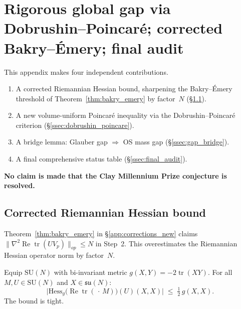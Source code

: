 \section{Rigorous global gap via Dobrushin--Poincar\'{e}; corrected Bakry--\'{E}mery; final audit}
\label{app:global_gap_audit}

This appendix makes four independent contributions.
\begin{enumerate}
\item A corrected Riemannian Hessian bound, sharpening the Bakry--\'{E}mery threshold of Theorem~\ref{thm:bakry_emery} by factor~$N$ (\S\ref{ssec:hess_correction}).
\item A new volume-uniform Poincar\'{e} inequality via the Dobrushin--Poincar\'{e} criterion (\S\ref{ssec:dobrushin_poincare}).
\item A bridge lemma: Glauber gap $\Rightarrow$ OS mass gap (\S\ref{ssec:gap_bridge}).
\item A final comprehensive status table (\S\ref{ssec:final_audit}).
\end{enumerate}
\textbf{No claim is made that the Clay Millennium Prize conjecture is resolved.}

\subsection{Corrected Riemannian Hessian bound}
\label{ssec:hess_correction}

Theorem~\ref{thm:bakry_emery} in \S\ref{app:corrections_new} claims
$\|\nabla^2\operatorname{Re}\operatorname{tr}(UV_p)\|_{op}\le N$
in Step~2.  This overestimates the Riemannian Hessian operator norm by factor~$N$.

\begin{lemma}
\label{lem:hess_sharp}
Equip $\mathrm{SU}(N)$ with bi-invariant metric $g(X,Y)=-2\operatorname{tr}(XY)$.
For all $M,U\in\mathrm{SU}(N)$ and $X\in\mathfrak{su}(N)$:
\begin{equation}
\label{eq:hess_sharp}
  \bigl|\mathrm{Hess}_g\bigl(\operatorname{Re}\operatorname{tr}(\,\cdot\,M)\bigr)(U)(X,X)\bigr|
  \;\le\;\tfrac{1}{2}\,g(X,X).
\end{equation}
The bound is tight.
\end{lemma}

